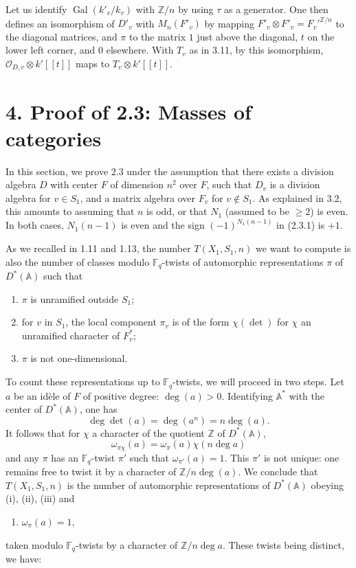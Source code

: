 \documentclass[10pt]{article}
\newcommand{\Fq}{\mathbb F_q}
\newcommand{\Z}{\mathbb Z}
\newcommand{\Adele}{\mathbb A}
\newcommand{\Gal}{\operatorname{Gal}}
\newcommand{\degm}{\operatorname{deg}}
\newcommand{\detm}{\operatorname{det}}
\theoremstyle{deligne}
\newcommand{\heading}[1]{\vspace{0.7em}\noindent{\bfseries #1}\quad}
\begin{document}
Let us identify $\Gal(k'_v/k_v)$ with $\Z/n$ by using $\tau$ as a generator. One then defines an isomorphism of $D'_v$ with $M_n(F'_v)$ by mapping $F'_v\otimes F'_v=F_v'^{\Z/n}$ to the diagonal matrices, and $\pi$ to the matrix $1$ just above the diagonal, $t$ on the lower left corner, and $0$ elsewhere. With $T_v$ as in 3.11, by this isomorphism, $\mathcal O_{D,v}\otimes k'[[t]]$ maps to $T_v\otimes k'[[t]]$.

\section*{4. Proof of 2.3: Masses of categories}

In this section, we prove 2.3 under the assumption that there exists a division algebra $D$ with center $F$ of dimension $n^2$ over $F$, such that $D_v$ is a division algebra for $v\in S_1$, and a matrix algebra over $F_v$ for $v\notin S_1$. As explained in 3.2, this amounts to assuming that $n$ is odd, or that $N_1$ (assumed to be $\ge2$) is even. In both cases, $N_1(n-1)$ is even and the sign $(-1)^{N_1(n-1)}$ in (2.3.1) is $+1$.

\heading{4.1.} As we recalled in 1.11 and 1.13, the number $T(X_1,S_1,n)$ we want to compute is also the number of classes modulo $\Fq$-twists of automorphic representations $\pi$ of $D^*(\Adele)$ such that
\begin{enumerate}[label=(\roman*)]
\item $\pi$ is unramified outside $S_1$;
\item for $v$ in $S_1$, the local component $\pi_v$ is of the form $\chi(\detm)$ for $\chi$ an unramified character of $F_v^*$;
\item $\pi$ is not one-dimensional.
\end{enumerate}
To count these representations up to $\Fq$-twists, we will proceed in two steps. Let $a$ be an id\`ele of $F$ of positive degree: $\degm(a)>0$. Identifying $\Adele^*$ with the center of $D^*(\Adele)$, one has
\[
\degm\detm(a)=\degm(a^n)=n\degm(a).
\]
It follows that for $\chi$ a character of the quotient $\Z$ of $D^*(\Adele)$,
\[
\omega_{\pi\chi}(a)=\omega_\pi(a)\chi(n\degm a)
\]
and any $\pi$ has an $\Fq$-twist $\pi'$ such that $\omega_{\pi'}(a)=1$. This $\pi'$ is not unique: one remains free to twist it by a character of $\Z/n\degm(a)$. We conclude that $T(X_1,S_1,n)$ is the number of automorphic representations of $D^*(\Adele)$ obeying (i), (ii), (iii) and
\begin{enumerate}[label=(\roman*),resume]
\item $\omega_\pi(a)=1$,
\end{enumerate}
taken modulo $\Fq$-twists by a character of $\Z/n\degm a$. These twists being distinct, we have:
\end{document}
